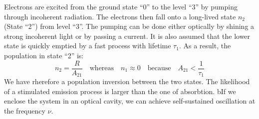 \documentclass{article}
\begin{document}
\begin{twocolumn}
\begin{donotbrake}
Electrons are excited from the ground state ``0'' to the level ``3'' by pumping through incoherent radiation. 
The electrons then fall onto a long-lived state $n_2$ (State ``2'') from level ``3''. 
The pumping can be done either optically by shining a strong incoherent light or by passing a current. 
It is also assumed that the lower state is quickly emptied by a fast process with lifetime $\tau_1$. 
As a result, the population in state ``2'' is:
$$n_2 = \frac{R}{A_{21}} \quad \text{whereas} \quad n_1 \approx 0 \quad \text{because} \quad  A_{21} < \frac{1}{\tau_1}$$
We have rherefore a population inversion between the two states. 
The likelihood of a stimulated emission process is larger than the one of absorbtion. 
bIf we enclose the system in an optical cavity, we can achieve self-sustained oscillation at the frequency $\nu$.

\end{donotbrake}

\end{twocolumn}
\end{document}
